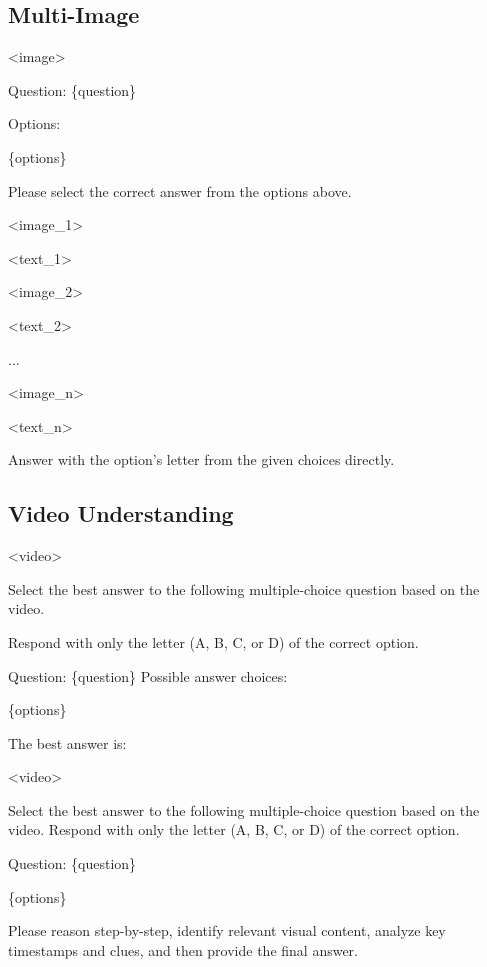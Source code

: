 \subsection{Multi-Image}
\label{sec:multi-img}

\begin{tcolorbox}[
  title=BLINK,
  fonttitle=\bfseries,
  colframe=black,
  colback=white,
  toptitle=1mm,
  bottomtitle=1mm,
  top=2mm,
  verbatim,
]
<image>

Question: \{question\}

Options:

\{options\}

Please select the correct answer from the options above.
\end{tcolorbox}

\begin{tcolorbox}[
  title=MUIRBENCH,
  fonttitle=\bfseries,
  colframe=black,
  colback=white,
  toptitle=1mm,
  bottomtitle=1mm,
  top=2mm,
  verbatim,
]
<image\_1>

<text\_1>

<image\_2>

<text\_2>

...

<image\_n>

<text\_n>

Answer with the option's letter from the given choices directly.
\end{tcolorbox}

\subsection{Video Understanding}
\label{sec:video}

\begin{tcolorbox}[
  title={MVBench | VideoMME | MLVU | LVBench - For instruct models},
  fonttitle=\bfseries,
  colframe=black,
  colback=white,
  toptitle=1mm,
  bottomtitle=1mm,
  top=2mm,
  verbatim,
]
<video>

Select the best answer to the following multiple-choice question based on the video. 

Respond with only the letter (A, B, C, or D) of the correct option.

Question: \{question\} Possible answer choices:

\{options\}

The best answer is:
\end{tcolorbox}

\begin{tcolorbox}[
  title={MVBench | VideoMME | MLVU | LVBench - For thinking models},
  fonttitle=\bfseries,
  colframe=black,
  colback=white,
  toptitle=1mm,
  bottomtitle=1mm,
  top=2mm,
  verbatim,
]
<video>

Select the best answer to the following multiple-choice question based on the video. Respond with only the letter (A, B, C, or D) of the correct option.

Question: \{question\}

\{options\}

Please reason step-by-step, identify relevant visual content, analyze key timestamps and clues, and then provide the final answer.
\end{tcolorbox}

